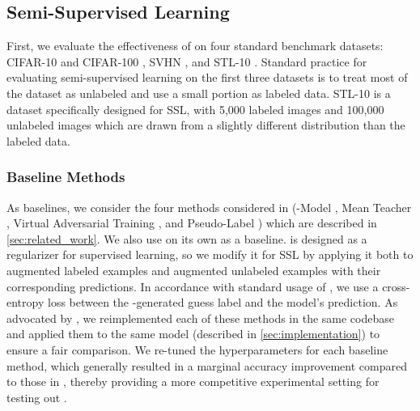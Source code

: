 \documentclass{article}
\begin{document}
\subsection{Semi-Supervised Learning}
\label{sec:ssl_experiments}

First, we evaluate the effectiveness of  on four standard benchmark datasets: CIFAR-10 and CIFAR-100 \cite{krizhevsky2009learning}, SVHN \cite{netzer2011reading}, and STL-10 \cite{coates2011analysis}.
Standard practice for evaluating semi-supervised learning on the first three datasets is to treat most of the dataset as unlabeled and use a small portion as labeled data.
STL-10 is a dataset specifically designed for SSL, with 5,000 labeled images and 100,000 unlabeled images which are drawn from a slightly different distribution than the labeled data.

\subsubsection{Baseline Methods}

As baselines, we consider the four methods considered in \cite{oliver2018realistic} (-Model \cite{laine2016temporal,sajjadi2016regularization}, Mean Teacher \cite{tarvainen2017weight}, Virtual Adversarial Training \cite{miyato2018virtual}, and Pseudo-Label \cite{lee2013pseudo}) which are described in \cref{sec:related_work}.
We also use  \cite{zhang2017mixup} on its own as a baseline.
 is designed as a regularizer for supervised learning, so we modify it for SSL by applying it both to augmented labeled examples and augmented unlabeled examples with their corresponding predictions.
In accordance with standard usage of , we use a cross-entropy loss between the -generated guess label and the model's prediction.
As advocated by \cite{oliver2018realistic}, we reimplemented each of these methods in the same codebase and applied them to the same model (described in \cref{sec:implementation}) to ensure a fair comparison.
We re-tuned the hyperparameters for each baseline method, which generally resulted in a marginal accuracy improvement compared to those in \cite{oliver2018realistic}, thereby providing a more competitive experimental setting for testing out .
\end{document}
